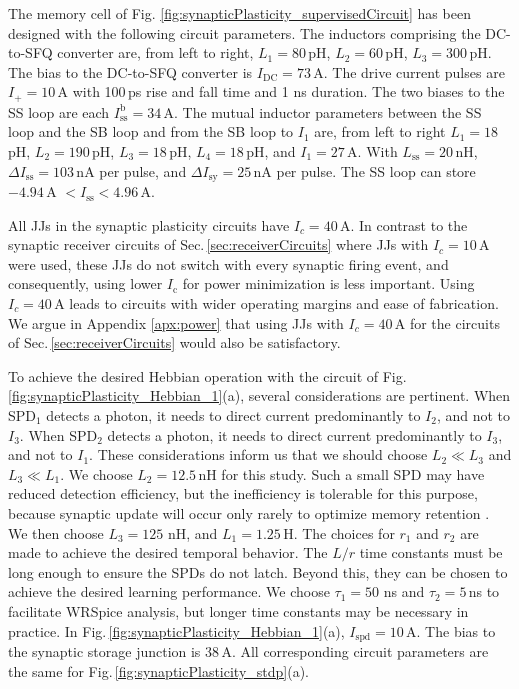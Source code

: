 \documentclass[aip,amsmath,amssymb,reprint,nofootinbib]{revtex4-1}
\begin{document}
The memory cell of Fig. \ref{fig:synapticPlasticity_supervisedCircuit} has been designed with the following circuit parameters. The inductors comprising the DC-to-SFQ converter are, from left to right, $L_1 = 80$\,pH, $L_2 = 60$\,pH, $L_3 = 300$\,pH. The bias to the DC-to-SFQ converter is $I_{\mathrm{DC}} = 73$\,\textmu A. The drive current pulses are $I_{+} = 10$\,\textmu A with 100\,ps rise and fall time and 1 ns duration. The two biases to the SS loop are each $I_{\mathrm{ss}}^{\mathrm{b}} = 34$\,\textmu A. The mutual inductor parameters between the SS loop and the SB loop and from the SB loop to $I_1$ are, from left to right $L_1 = 18$\,pH, $L_2 = 190$\,pH, $L_3 = 18$\,pH, $L_4 = 18$\,pH, and $I_1 = 27$\,\textmu A. With $L_{\mathrm{ss}} = 20$\,nH, $\Delta I_{\mathrm{ss}} = 103$\,nA per pulse, and $\Delta I_{\mathrm{sy}} = 25$\,nA per pulse. The SS loop can store $-4.94$\,\textmu A $< I_{\mathrm{ss}} < 4.96$\,\textmu A.

All JJs in the synaptic plasticity circuits have $I_c = 40$\,\textmu A. In contrast to the synaptic receiver circuits of Sec.\,\ref{sec:receiverCircuits} where JJs with $I_c = 10$\,\textmu A were used, these JJs do not switch with every synaptic firing event, and consequently, using lower $I_{\mathrm{c}}$ for power minimization is less important. Using $I_c = 40$\,\textmu A leads to circuits with wider operating margins and ease of fabrication. We argue in Appendix \ref{apx:power} that using JJs with $I_c = 40$\,\textmu A for the circuits of Sec.\,\ref{sec:receiverCircuits} would also be satisfactory.

To achieve the desired Hebbian operation with the circuit of Fig.\,\ref{fig:synapticPlasticity_Hebbian_1}(a), several considerations are pertinent. When SPD$_1$ detects a photon, it needs to direct current predominantly to $I_2$, and not to $I_3$. When SPD$_2$ detects a photon, it needs to direct current predominantly to $I_3$, and not to $I_1$. These considerations inform us that we should choose $L_2 \ll L_3$ and $L_3 \ll L_1$. We choose $L_2 = 12.5$\,nH for this study. Such a small SPD may have reduced detection efficiency, but the inefficiency is tolerable for this purpose, because synaptic update will occur only rarely to optimize memory retention \cite{fuab2007,lide2015}. We then choose $L_3 = 125$ nH, and $L_1 = 1.25$\,\textmu H. The choices for $r_1$ and $r_2$ are made to achieve the desired temporal behavior. The $L/r$ time constants must be long enough to ensure the SPDs do not latch. Beyond this, they can be chosen to achieve the desired learning performance. We choose $\tau_1 = 50$ ns and $\tau_2 = 5$\,ns to facilitate WRSpice analysis, but longer time constants may be necessary in practice. In Fig.\,\ref{fig:synapticPlasticity_Hebbian_1}(a), $I_{\mathrm{spd}} = 10$\,\textmu A. The bias to the synaptic storage junction is 38\,\textmu A. All corresponding circuit parameters are the same for Fig.\,\ref{fig:synapticPlasticity_stdp}(a).
\end{document}
